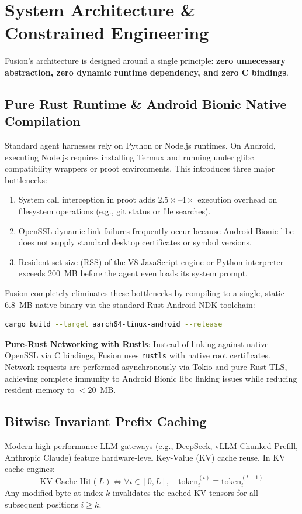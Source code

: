 \section{System Architecture \& Constrained Engineering}
\label{sec:arch}

Fusion's architecture is designed around a single principle: \textbf{zero unnecessary abstraction, zero dynamic runtime dependency, and zero C bindings}.

\subsection{Pure Rust Runtime \& Android Bionic Native Compilation}
Standard agent harnesses rely on Python or Node.js runtimes. On Android, executing Node.js requires installing Termux and running under glibc compatibility wrappers or proot environments. This introduces three major bottlenecks:
\begin{enumerate}
    \item System call interception in proot adds $2.5\times\text{--}4\times$ execution overhead on filesystem operations (e.g., git status or file searches).
    \item OpenSSL dynamic link failures frequently occur because Android Bionic libc does not supply standard desktop certificates or symbol versions.
    \item Resident set size (RSS) of the V8 JavaScript engine or Python interpreter exceeds 200~MB before the agent even loads its system prompt.
\end{enumerate}

Fusion completely eliminates these bottlenecks by compiling to a single, static 6.8~MB native binary via the standard Rust Android NDK toolchain:
\begin{lstlisting}[language=bash]
cargo build --target aarch64-linux-android --release
\end{lstlisting}

\noindent\textbf{Pure-Rust Networking with Rustls}:
Instead of linking against native OpenSSL via C bindings, Fusion uses \texttt{rustls} with native root certificates. Network requests are performed asynchronously via Tokio and pure-Rust TLS, achieving complete immunity to Android Bionic libc linking issues while reducing resident memory to $<20$~MB.

\subsection{Bitwise Invariant Prefix Caching}
Modern high-performance LLM gateways (e.g., DeepSeek, vLLM Chunked Prefill, Anthropic Claude) feature hardware-level Key-Value (KV) cache reuse. In KV cache engines:
\begin{equation}
\text{KV Cache Hit}(L) \iff \forall i \in [0, L], \quad \text{token}_i^{(t)} \equiv \text{token}_i^{(t-1)}
\end{equation}
Any modified byte at index $k$ invalidates the cached KV tensors for all subsequent positions $i \ge k$.

